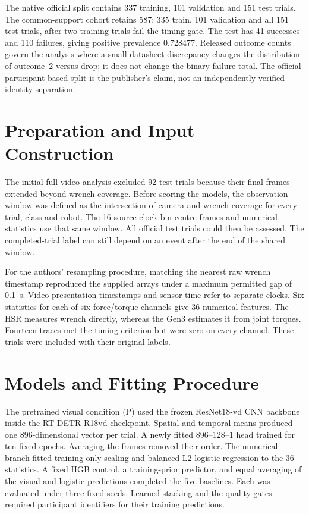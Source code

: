 The native official split contains 337 training, 101 validation and 151 test trials. The
common-support cohort retains 587: 335 train, 101 validation and all 151 test trials,
after two training trials fail the timing gate. The test has 41 successes and 110
failures, giving positive prevalence 0.728477. Released outcome counts govern the
analysis where a small datasheet discrepancy changes the distribution of outcome~2
versus drop; it does not change the binary failure total. The official participant-based
split is the publisher's claim, not an independently verified identity
separation.

\section{Preparation and Input Construction}
The initial full-video analysis excluded 92 test trials because their final frames
extended beyond wrench coverage. Before scoring the models, the observation window was
defined as the intersection of camera and wrench coverage for every trial, class and
robot. The 16 source-clock bin-centre frames and numerical statistics use that same
window. All official test trials could then be assessed. The completed-trial label can
still depend on an event after the end of the shared window.

For the authors' resampling procedure, matching the nearest raw wrench timestamp
reproduced the supplied arrays under a maximum permitted gap of 0.1~s. Video
presentation timestamps and sensor time refer to separate clocks. Six statistics for
each of six force/torque channels give 36 numerical features. The HSR measures wrench
directly, whereas the Gen3 estimates it from joint torques. Fourteen traces met the
timing criterion but were zero on every channel. These trials were included with their
original labels.

\section{Models and Fitting Procedure}
The pretrained visual condition (P) used the frozen ResNet18-vd CNN backbone inside the
RT-DETR-R18vd checkpoint. Spatial and temporal means produced one 896-dimensional vector
per trial. A newly fitted 896--128--1 head trained for ten fixed epochs. Averaging the
frames removed their order. The numerical branch fitted training-only scaling and
balanced L2 logistic regression to the 36 statistics. A fixed HGB control, a
training-prior predictor, and equal averaging of the visual and logistic predictions
completed the five baselines. Each was evaluated under three fixed seeds. Learned
stacking and the quality gates required participant identifiers for their training
predictions.

